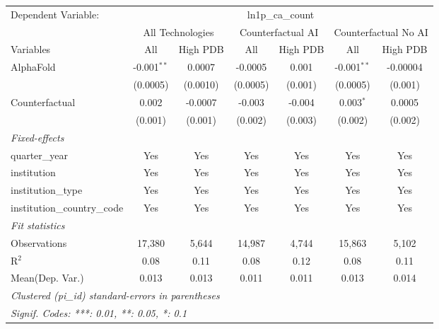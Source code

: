 \begingroup
\centering
\begin{tabular}{lcccccc}
   \tabularnewline \midrule \midrule
   Dependent Variable: & \multicolumn{6}{c}{ln1p\_ca\_count}\\
 & \multicolumn{2}{c}{All Technologies} & \multicolumn{2}{c}{Counterfactual AI} & \multicolumn{2}{c}{Counterfactual No AI} \\
\cmidrule(lr){1-1}\cmidrule(lr){2-3} \cmidrule(lr){4-5} \cmidrule(lr){6-7}
Variables & \multicolumn{1}{c}{All} & \multicolumn{1}{c}{High PDB} & \multicolumn{1}{c}{All} & \multicolumn{1}{c}{High PDB} & \multicolumn{1}{c}{All} & \multicolumn{1}{c}{High PDB} \\
\cmidrule(lr){1-1}\cmidrule(lr){2-2} \cmidrule(lr){3-3} \cmidrule(lr){4-4} \cmidrule(lr){5-5} \cmidrule(lr){6-6} \cmidrule(lr){7-7}
   AlphaFold                    & -0.001$^{**}$ & 0.0007   & -0.0005  & 0.001   & -0.001$^{**}$ & -0.00004\\   
                                & (0.0005)      & (0.0010) & (0.0005) & (0.001) & (0.0005)      & (0.001)\\   
   Counterfactual               & 0.002         & -0.0007  & -0.003   & -0.004  & 0.003$^{*}$   & 0.0005\\   
                                & (0.001)       & (0.001)  & (0.002)  & (0.003) & (0.002)       & (0.002)\\   
   \midrule
   \emph{Fixed-effects}\\
   quarter\_year                & Yes           & Yes      & Yes      & Yes     & Yes           & Yes\\  
   institution                  & Yes           & Yes      & Yes      & Yes     & Yes           & Yes\\  
   institution\_type            & Yes           & Yes      & Yes      & Yes     & Yes           & Yes\\  
   institution\_country\_code   & Yes           & Yes      & Yes      & Yes     & Yes           & Yes\\  
   \midrule
   \emph{Fit statistics}\\
   Observations                 & 17,380        & 5,644    & 14,987   & 4,744   & 15,863        & 5,102\\  
   R$^2$                        & 0.08          & 0.11     & 0.08     & 0.12    & 0.08          & 0.11\\  
Mean(Dep. Var.) & 0.013 & 0.013 & 0.011 & 0.011 & 0.013 & 0.014 \\
   \midrule \midrule
   \multicolumn{7}{l}{\emph{Clustered (pi\_id) standard-errors in parentheses}}\\
   \multicolumn{7}{l}{\emph{Signif. Codes: ***: 0.01, **: 0.05, *: 0.1}}\\
\end{tabular}
\par\endgroup
